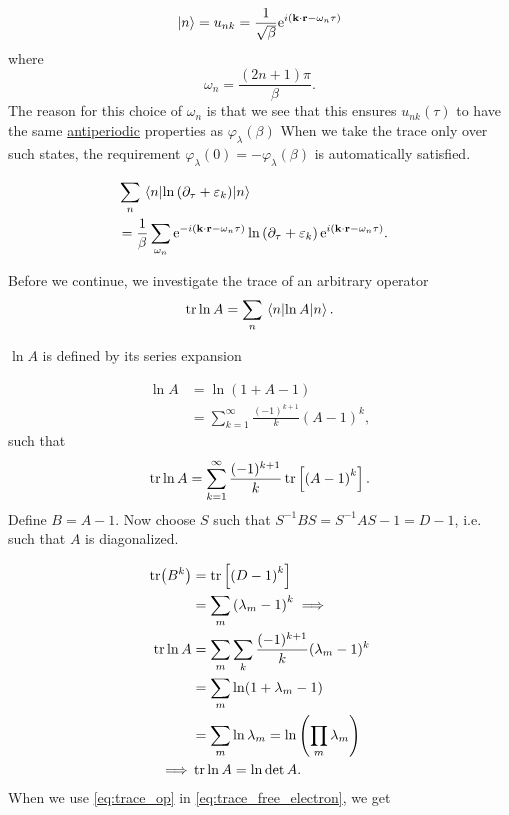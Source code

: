 \begin{equation}
\ket n = u_{nk} = \frac{1}{\sqrt{\beta}}\mathrm{e}^{i\left(\textbf{k}\cdot\textbf{r} - \omega_n\tau \right)}
\end{equation}
where
\begin{equation}
\omega_n = \frac{\left(2n+1\right)\pi}{\beta}.
\end{equation}
The reason for this choice of $\omega_n$ is that we see that this ensures $u_{nk}(\tau)$ to have the same \underline{antiperiodic} properties as $\varphi_\lambda(\beta)$
When we take the trace only over such states, the requirement \( \varphi_\lambda(0) = -\varphi_\lambda(\beta)\) is automatically satisfied.

\begin{align}
&\sum_n \ev{\ln\left(\partial_\tau + \varepsilon_k\right)}{n} & \nonumber \\
& = \frac{1}{\beta}\sum_{\omega_n}\e^{-i\left(\textbf{k}\cdot \textbf{r} - \omega_n\tau\right)}\ln\left(\partial_\tau + \varepsilon_k\right)\e^{i\left(\textbf{k}\cdot \textbf{r} - \omega_n\tau\right)}. \label{eq:trace_free_electron}&
\end{align}

Before we continue, we investigate the trace of an arbitrary operator
\begin{equation}
\tr\ln A = \sum_n\ev{\ln A}{n}.
\end{equation}

$\ln A$ is defined by its series expansion

\begin{align}
\ln A &= \ln (1+A-1) \nonumber \\
&= \sum_{k=1}^\infty\frac{(-1)^{k+1}}{k}\left(A-1\right)^k,
\end{align}
such that 
\begin{equation}
\tr\ln A = \sum_{k=1}^\infty\frac{(-1)^{k+1}}{k}\tr\left[\left(A-1\right)^k\right].
\end{equation}
Define $B = A-1$. Now choose $S$ such that $S^{-1}BS = S^{-1}AS -1 = D-1$, i.e. such that $A$ is diagonalized. 

\begin{align}
\tr(B^k) &= \tr\left[\left(D-1\right)^k\right] \nonumber\\
&= \sum_m \left(\lambda_m -1\right)^k
\implies\nonumber \\
\tr\ln A &= \sum_m\sum_k\frac{(-1)^{k+1}}{k}(\lambda_m-1)^k\nonumber \\
&= \sum_m\ln(1+\lambda_m -1)\nonumber \\
&= \sum_m \ln\lambda_m = \ln \left(\prod_m\lambda_m\right)\nonumber \\
\implies & \tr\ln A = \ln\det A. \label{eq:trace_op}
\end{align}
When we use \eqref{eq:trace_op} in \eqref{eq:trace_free_electron}, we get

